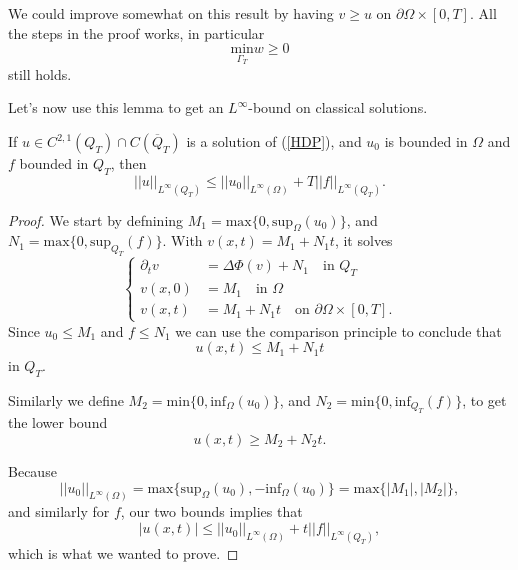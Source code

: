 \documentclass[11pt, a4paper]{article}
\begin{document}
\setcounter{rem}{0}
\begin{rem}
We could improve somewhat on this result by having $v \geq u$ on $\partial \Omega \times [0,T]$. All the steps in the proof works, in particular
\begin{equation*}
\underset{\Gamma_T}{\mathrm{min}}w \geq 0
\end{equation*} 
still holds.
\end{rem}

Let's now use this lemma to get an $L^\infty$-bound on classical solutions.
\begin{lemma}
If $u \in C^{2,1}(Q_T)\cap C(\overline{Q}_T)$ is a solution of (\ref{HDP}), and $u_0$ is bounded in $\Omega$ and $f$ bounded in $Q_T$, then
	\begin{equation}
		\label{infinity_bound}
		||u||_{L^\infty(Q_T)} \leq ||u_0||_{L^\infty(\Omega)} + T||f||_{L^\infty(Q_T)}.
	\end{equation}
\end{lemma}

\begin{proof}
We start by defnining $M_1 = \mathrm{max}\{0, \mathrm{sup}_\Omega(u_0) \}$, and $N_1 = \mathrm{max}\{0, \mathrm{sup}_{Q_T}(f) \}$. With $v(x,t) = M_1 + N_1t$, it solves
\begin{equation*}
\begin{cases}
	\partial_t v &= \Delta\Phi(v) +N_1 \quad \text{in } Q_T\\
	v(x,0) &= M_1 \quad \text{in } \Omega \\
	v(x,t) &= M_1 + N_1t \quad \text{on } \partial \Omega \times [0,T].
\end{cases}
\end{equation*}
Since $u_0 \leq M_1$ and $f\leq N_1$ we can use the comparison principle to conclude that
\begin{equation*}
u(x,t) \leq M_1 + N_1t
\end{equation*}
in $Q_T$.

Similarly we define $M_2 = \mathrm{min}\{ 0, \mathrm{inf}_\Omega(u_0) \}$, and $N_2 = \mathrm{min}\{ 0, \mathrm{inf}_{Q_T}(f) \}$, to get the lower bound
\begin{equation*}
u(x,t) \geq M_2 + N_2t.
\end{equation*}

Because
\begin{equation*}
||u_0||_{L^\infty(\Omega)} = \mathrm{max}\{ \mathrm{sup}_\Omega(u_0), -\mathrm{inf}_\Omega (u_0)\} = \mathrm{max}\{|M_1|,|M_2|\},
\end{equation*}
and similarly for $f$, our two bounds implies that
\begin{equation*}
|u(x,t)| \leq ||u_0||_{L^\infty(\Omega)} + t||f||_{L^\infty(Q_T)},
\end{equation*}
which  is what we wanted to prove.

\end{proof}
\end{document}
